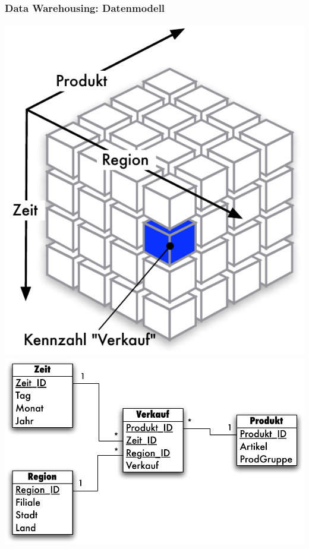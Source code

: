 \begin{frame}
\frametitle{Data Warehousing: Datenmodell}

\includegraphics[scale=.4]{fig1/cube.pdf}\quad
\includegraphics[scale=.4]{fig1/starschema.pdf}

\end{frame}


